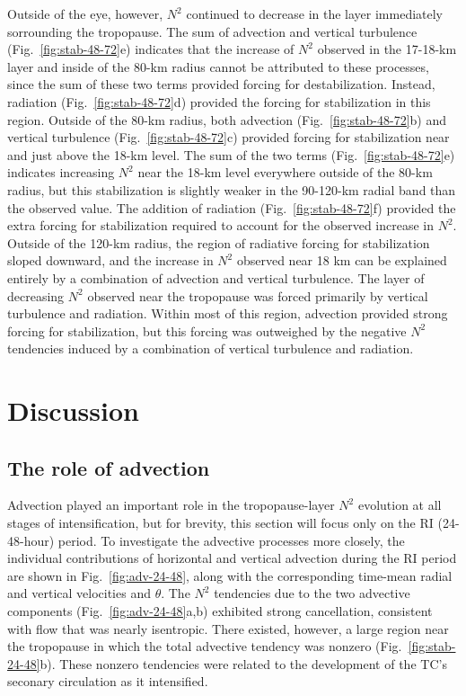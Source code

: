 \documentclass{ametsoc}
\begin{document}
Outside of the eye, however, $N^2$ continued to decrease in the layer immediately sorrounding the tropopause.
The sum of advection and vertical turbulence (Fig.~\ref{fig:stab-48-72}e) indicates that the increase of $N^2$ observed in the 17-18-km layer and inside of the 80-km radius cannot be attributed to these processes, since the sum of these two terms provided forcing for destabilization.
Instead, radiation (Fig.~\ref{fig:stab-48-72}d) provided the forcing for stabilization in this region.
Outside of the 80-km radius, both advection (Fig.~\ref{fig:stab-48-72}b) and vertical turbulence (Fig.~\ref{fig:stab-48-72}c) provided forcing for stabilization near and just above the 18-km level.
The sum of the two terms (Fig.~\ref{fig:stab-48-72}e) indicates increasing $N^2$ near the 18-km level everywhere outside of the 80-km radius, but this stabilization is slightly weaker in the 90-120-km radial band than the observed value.
The addition of radiation (Fig.~\ref{fig:stab-48-72}f) provided the extra forcing for stabilization required to account for the observed increase in $N^2$.
Outside of the 120-km radius, the region of radiative forcing for stabilization sloped downward, and the increase in $N^2$ observed near 18 km can be explained entirely by a combination of advection and vertical turbulence.
The layer of decreasing $N^2$ observed near the tropopause was forced primarily by vertical turbulence and radiation.
Within most of this region, advection provided strong forcing for stabilization, but this forcing was outweighed by the negative $N^2$ tendencies induced by a combination of vertical turbulence and radiation.

  \section{Discussion}

  \subsection{The role of advection}

Advection played an important role in the tropopause-layer $N^2$ evolution at all stages of intensification, but for brevity, this section will focus only on the RI (24-48-hour) period.
To investigate the advective processes more closely, the individual contributions of horizontal and vertical advection during the RI period are shown in Fig.~\ref{fig:adv-24-48}, along with the corresponding time-mean radial and vertical velocities and $\theta$.
The $N^2$ tendencies due to the two advective components (Fig.~\ref{fig:adv-24-48}a,b) exhibited strong cancellation, consistent with flow that was nearly isentropic.
There existed, however, a large region near the tropopause in which the total advective tendency was nonzero (Fig.~\ref{fig:stab-24-48}b).
These nonzero tendencies were related to the development of the TC's seconary circulation as it intensified.
\end{document}
